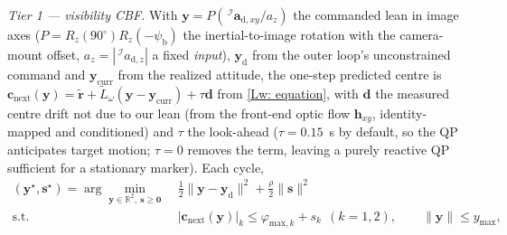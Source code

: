 \documentclass{IEEEtaes}
\theoremstyle{definition}
\theoremstyle{remark}
\begin{document}
\emph{Tier 1 --- visibility CBF.} With $\boldsymbol{y}=P(\,^\mathcal{I}\boldsymbol{a}_{\text{d},xy}/a_z)$ the commanded lean in image axes ($P=R_z(90^\circ)R_z(-\psi_\text{b})$ the inertial-to-image rotation with the camera-mount offset, $a_z=|\,^\mathcal{I}a_{\text{d},z}|$ a fixed \emph{input}), $\boldsymbol{y}_\text{d}$ from the outer loop's unconstrained command and $\boldsymbol{y}_\text{curr}$ from the realized attitude, the one-step predicted centre is $\boldsymbol{c}_\text{next}(\boldsymbol{y})=\tilde{\boldsymbol{r}}+\tilde{L}_\omega(\boldsymbol{y}-\boldsymbol{y}_\text{curr})+\tau\boldsymbol{d}$ from \eqref{Lw: equation}, with $\boldsymbol{d}$ the measured centre drift not due to our lean (from the front-end optic flow $\boldsymbol{h}_{xy}$, identity-mapped and conditioned) and $\tau$ the look-ahead ($\tau=0.15$~s by default, so the QP anticipates target motion; $\tau=0$ removes the term, leaving a purely reactive QP sufficient for a stationary marker). Each cycle,
\begin{equation} \label{cbf qp: equation}
\begin{aligned}
    (\boldsymbol{y}^\star,\boldsymbol{s}^\star)=\arg\min_{\boldsymbol{y}\in\mathbb{R}^2,\ \boldsymbol{s}\ge\boldsymbol{0}}\ &\tfrac12\|\boldsymbol{y}-\boldsymbol{y}_\text{d}\|^2+\tfrac{\rho}{2}\|\boldsymbol{s}\|^2\\[-1pt]
    \text{s.t.}\quad &\big|\boldsymbol{c}_\text{next}(\boldsymbol{y})\big|_k\le\varphi_{\text{max},k}+s_k\ \ (k=1,2),\qquad \|\boldsymbol{y}\|\le y_\text{max},
\end{aligned}
\end{equation}
\end{document}
